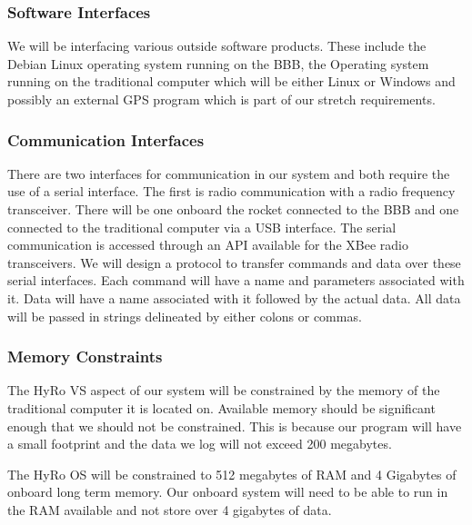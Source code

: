 \documentclass[10pt,draftclsnofoot,onecolumn,compsoc]{IEEEtran}
\begin{document}
\subsubsection{Software Interfaces}
	We will be interfacing various outside software products. These include the Debian Linux operating system running on the BBB, the Operating system running on the traditional computer which will be either Linux or Windows and possibly an external GPS program which is part of our stretch requirements.

\subsubsection{Communication Interfaces}
There are two interfaces for communication in our system and both require the use of a serial interface. The first is radio communication with a radio frequency transceiver. There will be one onboard the rocket connected to the BBB and one connected to the traditional computer via a USB interface. The serial communication is accessed through an API available for the XBee radio transceivers. We will design a protocol to transfer commands and data over these serial interfaces. Each command will have a name and parameters associated with it. Data will have a name associated with it followed by the actual data. All data will be passed in strings delineated by either colons or commas.

\subsubsection{Memory Constraints}
The HyRo VS aspect of our system will be constrained by the memory of the traditional computer it is located on. Available memory should be significant enough that we should not be constrained. This is because our program will have a small footprint and the data we log will not exceed 200 megabytes.\par 
	The HyRo OS will be constrained to 512 megabytes of RAM and 4 Gigabytes of onboard long term memory. Our onboard system will need to be able to run in the RAM available and not store over 4 gigabytes of data.
\end{document}
